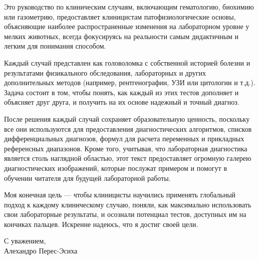 \documentclass[a4paper,12pt]{book}
\begin{document}
Это руководство по клиническим случаям, включающим гематологию, биохимию или газометрию, предоставляет клиницистам патофизиологические основы, объясняющие наиболее распространенные изменения на лабораторном уровне у мелких животных, всегда фокусируясь на реальности самым дидактичным и легким для понимания способом.

Каждый случай представлен как головоломка с собственной историей болезни и результатами физикального обследования, лабораторных и других дополнительных методов (например, рентгенографии, УЗИ или цитологии и т.д.). Задача состоит в том, чтобы понять, как каждый из этих тестов дополняет и объясняет друг друга, и получить на их основе надежный и точный диагноз.

После решения каждый случай сохраняет образовательную ценность, поскольку все они используются для предоставления диагностических алгоритмов, списков дифференциальных диагнозов, формул для расчета переменных и прикладных референсных диапазонов. Кроме того, учитывая, что лабораторная диагностика является столь наглядной областью, этот текст предоставляет огромную галерею диагностических изображений, которые послужат примером и помогут в обучении читателя для будущей лабораторной работы.

Моя конечная цель — чтобы клиницисты научились применять глобальный подход к каждому клиническому случаю, поняли, как максимально использовать свои лабораторные результаты, и осознали потенциал тестов, доступных им на кончиках пальцев. Искренне надеюсь, что я достиг своей цели.

\begin{flushright}
С уважением,\\
Алехандро Перес-Эсиха
\end{flushright}

\newpage
\setcounter{page}{1}
\tableofcontents
\end{document}
